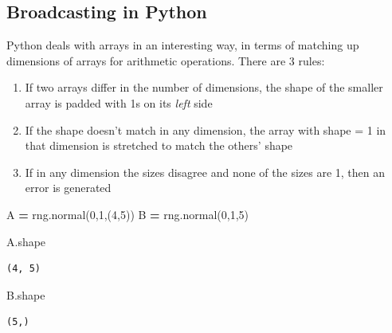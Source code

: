 \documentclass[
  letterpaper,
]{scrbook}
\newenvironment{Shaded}{\begin{snugshade}}{\end{snugshade}}
\newcommand{\DecValTok}[1]{\textcolor[rgb]{0.00,0.00,0.81}{#1}}
\newcommand{\NormalTok}[1]{#1}
\newcommand{\OperatorTok}[1]{\textcolor[rgb]{0.81,0.36,0.00}{\textbf{#1}}}
\providecommand{\tightlist}{%
  \setlength{\itemsep}{0pt}\setlength{\parskip}{0pt}}
\begin{document}
\hypertarget{broadcasting-in-python}{%
\subsection{Broadcasting in Python}\label{broadcasting-in-python}}

Python deals with arrays in an interesting way, in terms of matching up dimensions of arrays for arithmetic operations. There are 3 rules:

\begin{enumerate}
\def\labelenumi{\arabic{enumi}.}
\tightlist
\item
  If two arrays differ in the number of dimensions, the shape of the smaller array is padded with 1s on its \emph{left} side
\item
  If the shape doesn't match in any dimension, the array with shape = 1 in that dimension is stretched to match the others' shape
\item
  If in any dimension the sizes disagree and none of the sizes are 1, then an error is generated
\end{enumerate}

\begin{Shaded}
\begin{Highlighting}[]
\NormalTok{A }\OperatorTok{=}\NormalTok{ rng.normal(}\DecValTok{0}\NormalTok{,}\DecValTok{1}\NormalTok{,(}\DecValTok{4}\NormalTok{,}\DecValTok{5}\NormalTok{))}
\NormalTok{B }\OperatorTok{=}\NormalTok{ rng.normal(}\DecValTok{0}\NormalTok{,}\DecValTok{1}\NormalTok{,}\DecValTok{5}\NormalTok{)}
\end{Highlighting}
\end{Shaded}

\begin{Shaded}
\begin{Highlighting}[]
\NormalTok{A.shape}
\end{Highlighting}
\end{Shaded}

\begin{verbatim}
(4, 5)
\end{verbatim}

\begin{Shaded}
\begin{Highlighting}[]
\NormalTok{B.shape}
\end{Highlighting}
\end{Shaded}

\begin{verbatim}
(5,)
\end{verbatim}
\end{document}
